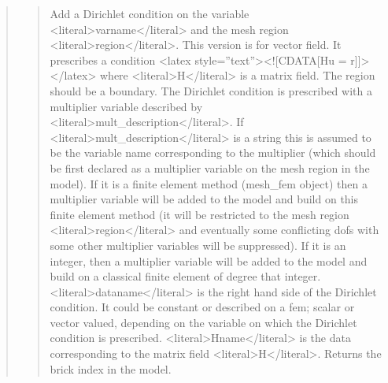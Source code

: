 \documentclass[a4paper,11pt,english]{sphinxmanual}
\begin{document}
\begin{quote}
\begin{quote}
\sphinxAtStartPar
Add a Dirichlet condition on the variable \textless{}literal\textgreater{}varname\textless{}/literal\textgreater{} and the mesh
region \textless{}literal\textgreater{}region\textless{}/literal\textgreater{}.  This version is for vector field.
It prescribes a condition \textless{}latex style=”text”\textgreater{}\textless{}!{[}CDATA{[}Hu = r{]}{]}\textgreater{}\textless{}/latex\textgreater{}
where \textless{}literal\textgreater{}H\textless{}/literal\textgreater{} is a matrix field. The region should be a boundary. The Dirichlet
condition is prescribed with a multiplier variable described by
\textless{}literal\textgreater{}mult\_description\textless{}/literal\textgreater{}. If \textless{}literal\textgreater{}mult\_description\textless{}/literal\textgreater{} is a string this is assumed
to be the variable name corresponding to the multiplier (which should be
first declared as a multiplier variable on the mesh region in the model).
If it is a finite element method (mesh\_fem object) then a multiplier
variable will be added to the model and build on this finite element
method (it will be restricted to the mesh region \textless{}literal\textgreater{}region\textless{}/literal\textgreater{} and eventually
some conflicting dofs with some other multiplier variables will be
suppressed). If it is an integer, then a  multiplier variable will be
added to the model and build on a classical finite element of degree
that integer. \textless{}literal\textgreater{}dataname\textless{}/literal\textgreater{} is the right hand side of  the
Dirichlet condition. It could be constant or described on a fem; scalar
or vector valued, depending on the variable on which the Dirichlet
condition is prescribed. \textless{}literal\textgreater{}Hname\textless{}/literal\textgreater{} is the data
corresponding to the matrix field \textless{}literal\textgreater{}H\textless{}/literal\textgreater{}.
Returns the brick index in the model.
\end{quote}

\sphinxAtStartPar
{}
\begin{quote}


\end{quote}
\end{quote}
\end{document}
